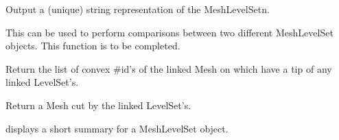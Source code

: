 \documentclass[a4paper,11pt,english]{sphinxmanual}
\begin{document}
\begin{fulllineitems}
\begin{fulllineitems}
\end{fulllineitems}


\begin{fulllineitems}
\label{\detokenize{python/cmdref_MeshLevelSet:getfem.MeshLevelSet.char}}
Output a (unique) string representation of the MeshLevelSetn.

This can be used to perform comparisons between two
different MeshLevelSet objects.
This function is to be completed.

\end{fulllineitems}


\begin{fulllineitems}
\label{\detokenize{python/cmdref_MeshLevelSet:getfem.MeshLevelSet.crack_tip_convexes}}
Return the list of convex \#id’s of the linked Mesh on
which have a tip of any linked LevelSet’s.

\end{fulllineitems}


\begin{fulllineitems}
\label{\detokenize{python/cmdref_MeshLevelSet:getfem.MeshLevelSet.cut_mesh}}
Return a Mesh cut by the linked LevelSet’s.

\end{fulllineitems}


\begin{fulllineitems}
\label{\detokenize{python/cmdref_MeshLevelSet:getfem.MeshLevelSet.display}}
displays a short summary for a MeshLevelSet object.

\end{fulllineitems}



\end{fulllineitems}
\end{document}
